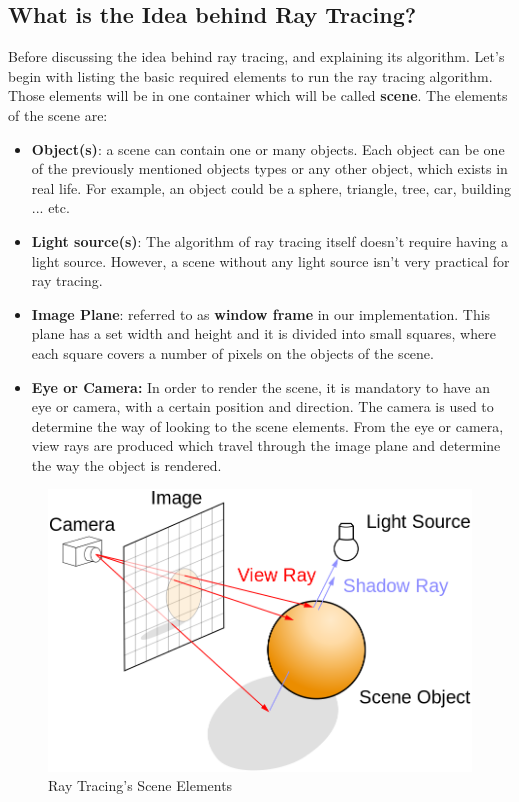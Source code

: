 \documentclass{article}
\begin{document}
	\subsection{What is the Idea behind  Ray Tracing?}
	Before discussing the idea behind ray tracing, and explaining its algorithm. Let's begin with listing the basic required elements to run the ray tracing algorithm. Those elements will be in one container which will be called \textbf{scene}. The elements of the scene are:
	\begin{itemize}
		\item \textbf{Object(s)}: a scene can contain one or many objects. Each object can be one of the previously mentioned objects types or any other object, which exists in real life. For example, an object could be a sphere, triangle, tree, car, building ... etc.
		\item \textbf{Light source(s)}: The algorithm of ray tracing itself doesn't require having a light source. However, a scene without any light source isn't very practical for ray tracing.
		\item \textbf{Image Plane}: referred to as \textbf{window frame} in our implementation. This plane has a set width and height and it is divided into small squares, where each square covers a number of pixels on the objects of the scene.
		\item \textbf{Eye or Camera:} In order to render the scene, it is mandatory to have an eye or camera, with a certain position and direction. The camera is used to determine the way of looking to the scene elements. From the eye or camera, view rays are produced which travel through the image plane and determine the way the object is rendered.
		
	\end{itemize}
	\begin{figure}[ht!]
		\centering
		\includegraphics[scale=0.30]{./raytracing.png}
		\caption{Ray Tracing's Scene Elements \cite{raytracingpic}}
		\label{fig:raytracing}
	\end{figure}
\end{document}
